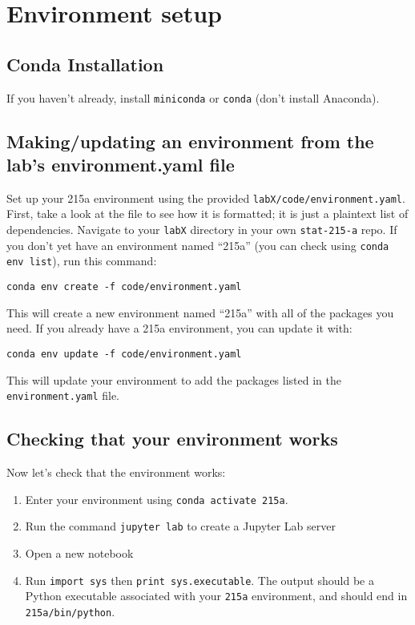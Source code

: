 \documentclass[letterpaper,12pt]{article}
\begin{document}
\section{Environment setup}

\subsection{Conda Installation}
If you haven't already, install \texttt{miniconda} or \texttt{conda} (don't install Anaconda).

\subsection{Making/updating an environment from the lab's environment.yaml file}
Set up your 215a environment using the provided \texttt{labX/code/environment.yaml}. First, take a look at the file to see how it is formatted; it is just a plaintext list of dependencies. Navigate to your \texttt{labX} directory in your own \texttt{stat-215-a} repo. If you don't yet have an environment named ``215a'' (you can check using \texttt{conda env list}), run this command:
\begin{verbatim}
conda env create -f code/environment.yaml
\end{verbatim}
This will create a new environment named ``215a'' with all of the packages you need. If you already have a 215a environment, you can update it with:
\begin{verbatim}
conda env update -f code/environment.yaml
\end{verbatim}
This will update your environment to add the packages listed in the \texttt{environment.yaml} file.

\subsection{Checking that your environment works}
Now let's check that the environment works:
\begin{enumerate}
    \item Enter your environment using \texttt{conda activate 215a}.
    \item Run the command \texttt{jupyter lab} to create a Jupyter Lab server
    \item Open a new notebook
    \item Run \texttt{import sys} then \texttt{print sys.executable}. The output should be a Python executable associated with your \texttt{215a} environment, and should end in \texttt{215a/bin/python}.
\end{enumerate}
\end{document}
